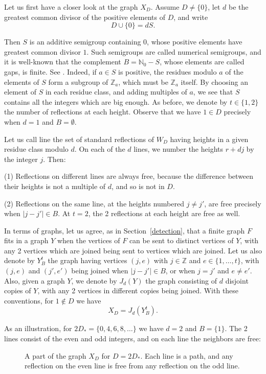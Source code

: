 \documentclass[11pt,a4paper]{article}
\begin{document}
Let us first have a closer look at the graph $X_D$. Assume $D\neq\{0\}$, let $d$ be the greatest common divisor of the positive elements of $D$, and write
\[
 D\cup\{0\}=dS.
\]

Then $S$ is an additive semigroup containing $0$, whose positive elements have greatest common divisor $1$. Such semigroups are called numerical semigroups, and it is well-known that the complement $B=\mathbb N_0-S$, whose elements are called gaps, is finite. See \cite{rgs}. Indeed, if $a\in S$ is positive, the residues modulo $a$ of the elements of $S$ form a subgroup of $\mathbb Z_a$, which must be $\mathbb Z_a$ itself. By choosing an element of $S$ in each residue class, and adding multiples of $a$, we see that $S$ contains all the integers which are big enough. As before, we denote by $t\in\{1,2\}$ the number of reflections at each height. Observe that we have $1\in D$ precisely when $d=1$ and $B=\emptyset$.

Let us call line the set of standard reflections of $W_D$ having heights in a given residue class modulo $d$. On each of the $d$ lines, we number the heights $r+dj$ by the integer $j$. Then:

(1) Reflections on different lines are always free, because the difference between their heights is not a multiple of $d$, and so is not in $D$.

(2) Reflections on the same line, at the heights numbered $j\neq j'$, are free precisely when $|j-j'|\in B$. At $t=2$, the 2 reflections at each height are free as well.

In terms of graphs, let us agree, as in Section~\ref{detection}, that a finite graph $F$ fits in a graph $Y$ when the vertices of $F$ can be sent to distinct vertices of $Y$, with any 2 vertices which are joined being sent to vertices which are joined. Let us also denote by $Y_B^t$ the graph having vertices $(j,e)$ with $j\in\mathbb Z$ and $e\in\{1,\ldots,t\}$, with $(j,e)$ and $(j',e')$ being joined when $|j-j'|\in B$, or when $j=j'$ and $e\neq e'$. Also, given a graph $Y$, we denote by $J_d(Y)$ the graph consisting of $d$ disjoint copies of $Y$, with any 2 vertices in different copies being joined. With these conventions, for $1\notin D$ we have
\[
 X_D=J_d(Y_B^t).
\]

As an illustration, for $2D_*=\{0,4,6,8,\ldots\}$ we have $d=2$ and $B=\{1\}$. The 2 lines consist of the even and odd integers, and on each line the neighbors are free:

\begin{figure}[H]\centering
{}
\caption{A part of the graph $X_D$ for $D=2D_*$. Each line is a path, and any reflection on the even line is free from any reflection on the odd line.}
\label{residue-lines}
\end{figure}
\end{document}
